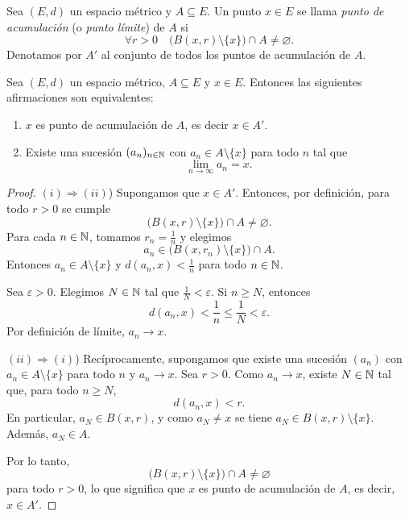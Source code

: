 \begin{defi}
Sea $(E,d)$ un espacio métrico y $A \subseteq E$.
Un punto $x \in E$ se llama \emph{punto de acumulación} (o
\emph{punto límite}) de $A$ si
\[
\forall r>0 \quad \bigl(B(x,r) \setminus \{x\}\bigr) \cap A \neq \varnothing.
\]
Denotamos por $A'$ al conjunto de todos los puntos de acumulación de $A$.
\end{defi}

\begin{prop}
Sea $(E,d)$ un espacio métrico, $A \subseteq E$ y $x \in E$.
Entonces las siguientes afirmaciones son equivalentes:
\begin{enumerate}[label=(\roman*)]
    \item $x$ es punto de acumulación de $A$, es decir $x \in A'$.
    \item Existe una sucesión $(a_n)_{n\in\mathbb{N}}$ con $a_n \in A \setminus \{x\}$
    para todo $n$ tal que
    \[
    \lim_{n\to\infty} a_n = x.
    \]
\end{enumerate}
\end{prop}

\begin{proof}
$(i) \Rightarrow (ii)$) Supongamos que $x \in A'$. Entonces, por definición,
para todo $r>0$ se cumple
\[
\bigl(B(x,r) \setminus \{x\}\bigr) \cap A \neq \varnothing.
\]
Para cada $n \in \mathbb{N}$, tomamos $r_n = \frac{1}{n}$ y elegimos
\[
a_n \in \bigl(B(x,r_n) \setminus \{x\}\bigr) \cap A.
\]
Entonces $a_n \in A \setminus \{x\}$ y $d(a_n,x) < \frac{1}{n}$ para todo
$n \in \mathbb{N}$.

Sea $\varepsilon>0$. Elegimos $N \in \mathbb{N}$ tal que
\(
\frac{1}{N} < \varepsilon.
\)
Si $n \ge N$, entonces
\[
d(a_n,x) < \frac{1}{n} \le \frac{1}{N} < \varepsilon.
\]
Por definición de límite, $a_n \to x$.

\medskip

$(ii) \Rightarrow (i)$) Recíprocamente, supongamos que existe una sucesión
$(a_n)$ con $a_n \in A \setminus \{x\}$ para todo $n$ y $a_n \to x$.
Sea $r>0$. Como $a_n \to x$, existe $N \in \mathbb{N}$ tal que, para todo $n \ge N$,
\[
d(a_n,x) < r.
\]
En particular, $a_N \in B(x,r)$, y como $a_N \neq x$ se tiene
$a_N \in B(x,r) \setminus \{x\}$. Además, $a_N \in A$.

Por lo tanto,
\[
\bigl(B(x,r) \setminus \{x\}\bigr) \cap A \neq \varnothing
\]
para todo $r>0$, lo que significa que $x$ es punto de acumulación de $A$,
es decir, $x \in A'$.
\end{proof}

